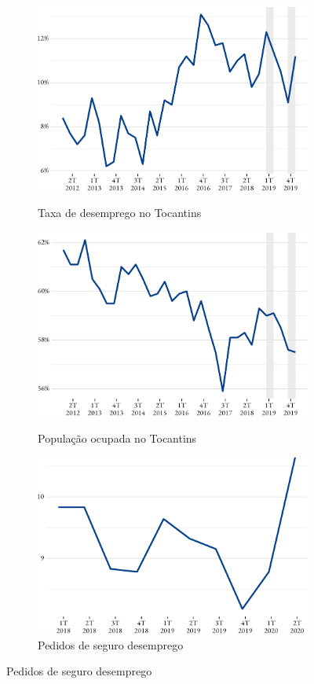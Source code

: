 \begin{figure}[!h]
	\begin{subfigure}{\linewidth}
		\caption{Taxa de desemprego no Tocantins}
		\includegraphics{fig/tx_desemprego_to-1.pdf}
		\label{fig:desemprego}
	\end{subfigure}
	\begin{subfigure}{\linewidth}
		\caption{População ocupada no Tocantins}
		\includegraphics{fig/pop_ocupada-1.pdf}
		\label{fig:ocupada}
	\end{subfigure}
	\begin{subfigure}{\linewidth}
		\caption{Pedidos de seguro desemprego}
		\includegraphics{fig/pedido_segudo_desem-1.pdf}

\end{subfigure}
\end{figure}
